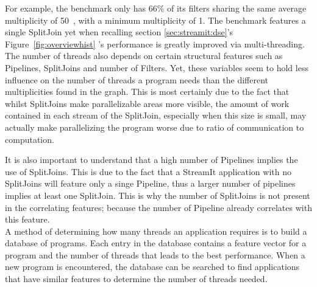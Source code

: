 For example, the benchmark  only has 66\% of its filters sharing the same average multiplicity of 50~\cite{thiesStreamit2010}, with a minimum multiplicity of 1. 
The benchmark features a single SplitJoin yet when recalling section \ref{sec:streamit:dse}'s Figure~\ref{fig:overviewhist} 's performance is greatly improved via multi-threading.
The number of threads also depends on certain structural features such as Pipelines, SplitJoins and number of Filters.
Yet, these variables seem to hold less influence on the number of threads a program needs than the different multiplicities found in the graph.
This is most certainly due to the fact that whilst SplitJoins make parallelizable areas more visible, the amount of work contained in each stream of the SplitJoin, especially when this size is small, may actually make parallelizing the program worse due to ratio of communication to computation.

It is also important to understand that a high number of Pipelines implies the use of SplitJoins.
This is due to the fact that a StreamIt application with no SplitJoins will feature only a singe Pipeline, thus a larger number of pipelines implies at least one SplitJoin.
This is why the number of SplitJoins is not present in the correlating features; because the number of Pipeline already correlates with this feature.\\


A method of determining how many threads an application requires is to build a database of programs.
Each entry in the database contains a feature vector for a program and the number of threads that leads to the best performance.
When a new program is encountered, the database can be searched to find applications that have similar features to determine the number of threads needed.


